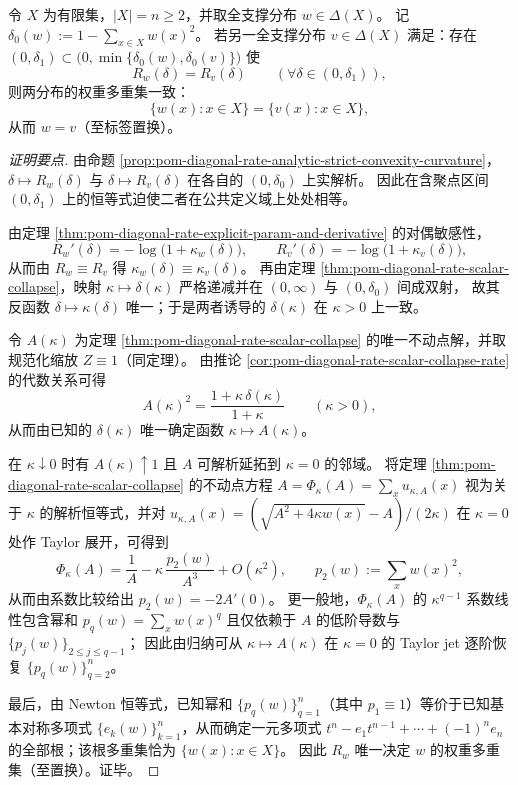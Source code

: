 \begin{theorem}\label{thm:pom-diagonal-rate-rate-curve-identifiability}
令 \(X\) 为有限集，\(|X|=n\ge 2\)，并取全支撑分布 \(w\in\Delta(X)\)。
记 \(\delta_0(w):=1-\sum_{x\in X}w(x)^2\)。
若另一全支撑分布 \(v\in\Delta(X)\) 满足：存在 \((0,\delta_1)\subset\bigl(0,\min\{\delta_0(w),\delta_0(v)\}\bigr)\) 使
\[
R_w(\delta)=R_v(\delta)\qquad(\forall \delta\in(0,\delta_1)),
\]
则两分布的权重多重集一致：
\[
\{w(x):x\in X\}=\{v(x):x\in X\},
\]
从而 \(w=v\)（至标签置换）。
\end{theorem}
\begin{proof}[证明要点]
由命题 \ref{prop:pom-diagonal-rate-analytic-strict-convexity-curvature}，\(\delta\mapsto R_w(\delta)\) 与 \(\delta\mapsto R_v(\delta)\) 在各自的 \((0,\delta_0)\) 上实解析。
因此在含聚点区间 \((0,\delta_1)\) 上的恒等式迫使二者在公共定义域上处处相等。
\par
由定理 \ref{thm:pom-diagonal-rate-explicit-param-and-derivative} 的对偶敏感性，
\[
R_w'(\delta)=-\log\bigl(1+\kappa_w(\delta)\bigr),
\qquad
R_v'(\delta)=-\log\bigl(1+\kappa_v(\delta)\bigr),
\]
从而由 \(R_w\equiv R_v\) 得 \(\kappa_w(\delta)\equiv \kappa_v(\delta)\)。
再由定理 \ref{thm:pom-diagonal-rate-scalar-collapse}，映射 \(\kappa\mapsto\delta(\kappa)\) 严格递减并在 \((0,\infty)\) 与 \((0,\delta_0)\) 间成双射，
故其反函数 \(\delta\mapsto \kappa(\delta)\) 唯一；于是两者诱导的 \(\delta(\kappa)\) 在 \(\kappa>0\) 上一致。
\par
令 \(A(\kappa)\) 为定理 \ref{thm:pom-diagonal-rate-scalar-collapse} 的唯一不动点解，并取规范化缩放 \(Z\equiv 1\)（同定理）。
由推论 \ref{cor:pom-diagonal-rate-scalar-collapse-rate} 的代数关系可得
\[
A(\kappa)^2=\frac{1+\kappa\,\delta(\kappa)}{1+\kappa}\qquad(\kappa>0),
\]
从而由已知的 \(\delta(\kappa)\) 唯一确定函数 \(\kappa\mapsto A(\kappa)\)。
\par
在 \(\kappa\downarrow 0\) 时有 \(A(\kappa)\uparrow 1\) 且 \(A\) 可解析延拓到 \(\kappa=0\) 的邻域。
将定理 \ref{thm:pom-diagonal-rate-scalar-collapse} 的不动点方程
\(
A=\Phi_\kappa(A)=\sum_x u_{\kappa,A}(x)
\)
视为关于 \(\kappa\) 的解析恒等式，并对
\(
u_{\kappa,A}(x)=(\sqrt{A^2+4\kappa w(x)}-A)/(2\kappa)
\)
在 \(\kappa=0\) 处作 Taylor 展开，可得到
\[
\Phi_\kappa(A)=\frac{1}{A}-\kappa\,\frac{p_2(w)}{A^3}+O(\kappa^2),
\qquad p_2(w):=\sum_x w(x)^2,
\]
从而由系数比较给出 \(p_2(w)=-2A'(0)\)。
更一般地，\(\Phi_\kappa(A)\) 的 \(\kappa^{q-1}\) 系数线性包含幂和 \(p_q(w)=\sum_x w(x)^q\) 且仅依赖于 \(A\) 的低阶导数与 \(\{p_j(w)\}_{2\le j\le q-1}\)；
因此由归纳可从 \(\kappa\mapsto A(\kappa)\) 在 \(\kappa=0\) 的 Taylor jet 逐阶恢复 \(\{p_q(w)\}_{q=2}^{n}\)。
\par
最后，由 Newton 恒等式，已知幂和 \(\{p_q(w)\}_{q=1}^{n}\)（其中 \(p_1\equiv 1\)）等价于已知基本对称多项式 \(\{e_k(w)\}_{k=1}^{n}\)，从而确定一元多项式
\(
t^n-e_1 t^{n-1}+\cdots+(-1)^n e_n
\)
的全部根；该根多重集恰为 \(\{w(x):x\in X\}\)。
因此 \(R_w\) 唯一决定 \(w\) 的权重多重集（至置换）。证毕。
\end{proof}

